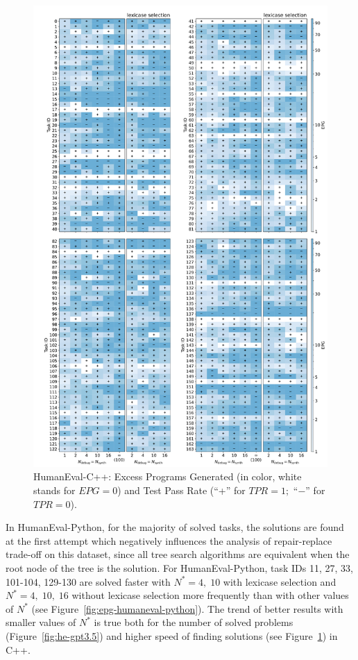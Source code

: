 \begin{figure}[H]
  \centering
  \includegraphics[width=.85\linewidth, trim={0mm 2.8mm 0mm 2mm}, clip]{images/epg_humaneval_C++_gpt35_01.pdf}  %
  \caption{HumanEval-C++: Excess Programs Generated (in color, white stands for $EPG=0$)  and Test Pass Rate (``+'' for $TPR=1;$ ``$-$'' for $TPR=0$).}
  \label{fig:epg-humaneval-c++}
\end{figure}


In HumanEval-Python, for the majority of solved tasks, the solutions are found at the first attempt which negatively influences the analysis of repair-replace trade-off on this dataset, since all tree search algorithms are equivalent when the root node of the tree is the solution.
For HumanEval-Python, task IDs 11, 27, 33, 101-104, 129-130 are solved faster with $N^*=4, \; 10$ with lexicase selection and $N^*=4, \; 10, \; 16$ without lexicase selection more frequently than with other values of $N^*$ (see Figure~\ref{fig:epg-humaneval-python}).
The trend of better results with smaller values of $N^*$ is true both for the number of solved problems (Figure~\ref{fig:he-gpt3.5}) and higher speed of finding solutions (see Figure~\ref{fig:epg-humaneval-c++}) in C++.

